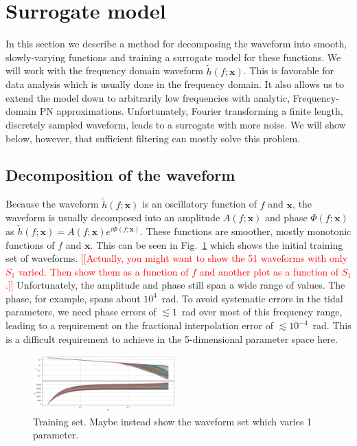 \documentclass[prd,aps,letter,twocolumn,floatfix,notitlepage,nofootinbib]{revtex4-1}
\def\bx{\mathbf{x}}
\newcommand{\red}[1]{\textcolor{red}{#1}}
\begin{document}
\section{Surrogate model}

In this section we describe a method for decomposing the waveform into smooth, slowly-varying functions and training a surrogate model for these functions. We will work with the frequency domain waveform $\tilde h(f; \bx)$. This is favorable for data analysis which is usually done in the frequency domain. It also allows us to extend the model down to arbitrarily low frequencies with analytic, Frequency-domain PN approximations. Unfortunately, Fourier transforming a finite length, discretely sampled waveform, leads to a surrogate with more noise. We will show below, however, that sufficient filtering can mostly solve this problem.

\subsection{Decomposition of the waveform}

Because the waveform $\tilde h(f; \bx)$ is an oscillatory function of $f$ and $\bx$, the waveform is usually decomposed into an amplitude $A(f; \bx)$ and phase $\Phi(f; \bx)$ as $\tilde h(f; \bx) = A(f; \bx) e^{i\Phi(f; \bx)}$. These functions are smoother, mostly monotonic functions of $f$ and $\bx$. This can be seen in Fig.~\ref{fig:h} which shows the initial training set of waveforms. \red{[[Actually, you might want to show the 51 waveforms with only $S_1$ varied. Then show them as a function of $f$ and another plot as a function of $S_1$.]]} Unfortunately, the amplitude and phase still span a wide range of values. The phase, for example, spans about $10^4$~rad. To avoid systematic errors in the tidal parameters, we need phase errors of $\lesssim 1$~rad over most of this frequency range, leading to a requirement on the fractional interpolation error of $\lesssim 10^{-4}$~rad. This is a difficult requirement to achieve in the 5-dimensional parameter space here. 

\begin{figure}[htb]
\centering
\includegraphics[width=0.49\textwidth]{h_trainingset.png}
\caption{Training set. Maybe instead show the waveform set which varies 1 parameter.}
\label{fig:h}
\end{figure}
\end{document}
